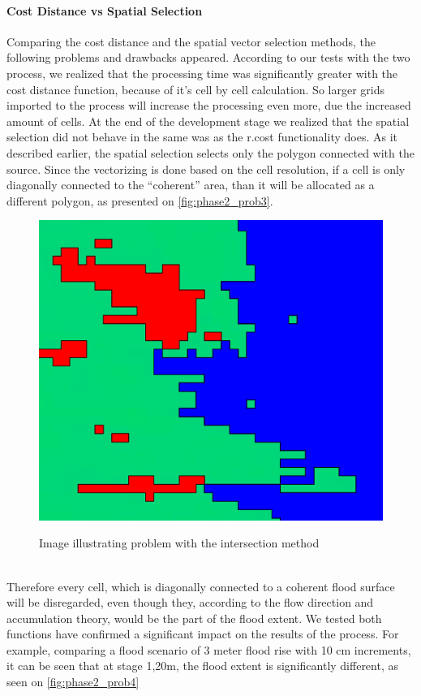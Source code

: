 \paragraph{Cost Distance vs Spatial Selection}

Comparing the cost distance and the spatial vector selection methods, the following problems and drawbacks appeared. According to our tests with the two process, we realized that the processing time was significantly greater with the cost distance function, because of it's cell by cell calculation. So larger grids imported to the process will increase the processing even more, due the increased amount of cells. At the end of the development stage we realized that the spatial selection did not behave in the same was as the r.cost functionality does. As it described earlier, the spatial selection selects only the polygon connected with the source. Since the vectorizing is done based on the cell resolution, if a cell is only diagonally connected to the “coherent” area, than it will be allocated as a different polygon, as presented on \autoref{fig:phase2_prob3}.

\begin{figure}[h!]
\centering
	{\includegraphics[width=0.75\linewidth]{gfx/Phase_2/problem3.png}}
\caption{Image illustrating problem with the intersection method}
\label{fig:phase2_prob3}
\end{figure}\\

Therefore every cell, which is diagonally connected to a coherent flood surface will be disregarded, even though they, according to the flow direction and accumulation theory, would be the part of the flood extent. 
We tested both functions have confirmed a significant impact on the results of the process. For example, comparing a flood scenario of 3 meter flood rise with 10 cm increments, it can be seen that at stage 1,20m, the flood extent is significantly different, as seen on \autoref{fig:phase2_prob4}

